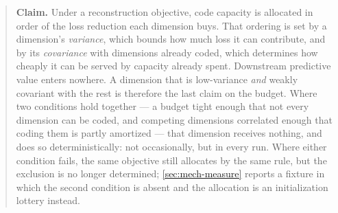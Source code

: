 \begin{quote}
\textbf{Claim.} Under a reconstruction objective, code capacity is allocated in order of the loss
reduction each dimension buys. That ordering is set by a dimension's \emph{variance}, which bounds
how much loss it can contribute, and by its \emph{covariance} with dimensions already coded, which
determines how cheaply it can be served by capacity already spent. Downstream predictive value
enters nowhere. A dimension that is low-variance \emph{and} weakly covariant with the rest is
therefore the last claim on the budget. Where two conditions hold together --- a budget tight
enough that not every dimension can be coded, and competing dimensions correlated enough that
coding them is partly amortized --- that dimension receives nothing, and does so deterministically:
not occasionally, but in every run. Where either condition fails, the same objective still
allocates by the same rule, but the exclusion is no longer determined; \cref{sec:mech-measure}
reports a fixture in which the second condition is absent and the allocation is an initialization
lottery instead.
\end{quote}

